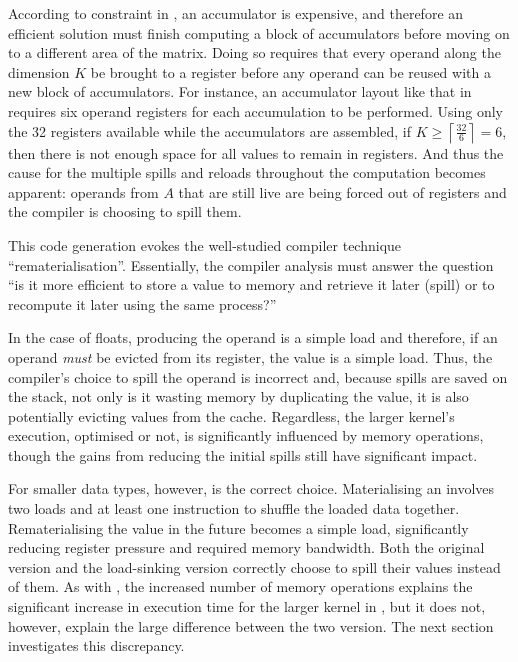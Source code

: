 \documentclass[\main/thesis.tex]{subfiles}
\begin{document}
According to constraint  in ,  an accumulator is expensive, and therefore an efficient solution must finish computing a block of accumulators before moving on to a different area of the matrix.
Doing so requires that every operand along the dimension $K$ be brought to a register before any operand can be reused with a new block of accumulators.
For instance, an accumulator layout like that in  requires six operand registers for each accumulation to be performed.
Using only the 32 registers available while the accumulators are assembled, if $K \geq \left\lceil \frac{32}{6} \right\rceil = 6$, then there is not enough space for all values to remain in registers.
And thus the cause for the multiple \glspl{spill} and reloads throughout the computation becomes apparent: operands from $A$ that are still \gls{live} are being forced out of registers and the compiler is choosing to \gls{spill} them.\footnotemark
{}

This code generation evokes the well-studied compiler technique ``\gls{rematerialisation}''.
Essentially, the compiler analysis must answer the question ``is it more efficient to store a value to memory and retrieve it later (\gls{spill}) or to recompute it later using the same process?''

In the case of floats, producing the operand is a simple load and therefore, if an operand \emph{must} be evicted from its register,  the value is a simple load.
Thus, the compiler's choice to \gls{spill} the operand is incorrect and, because \glspl{spill} are saved on the stack, not only is it wasting memory by duplicating the value, it is also potentially evicting values from the cache.
Regardless, the larger kernel's execution, optimised or not, is significantly influenced by memory operations, though the gains from reducing the initial \glspl{spill} still have significant impact.

For smaller data types, however,  is the correct choice.
Materialising an  involves two loads and at least one instruction to shuffle the loaded data together.
Rematerialising the value in the future becomes a simple load, significantly reducing register pressure and required memory bandwidth.
Both the original version and the load-sinking version correctly choose to \gls{spill} their values instead of  them.
As with , the increased number of memory operations explains the significant increase in execution time for the larger  kernel in , but it does not, however, explain the large difference between the two version.
The next section investigates this discrepancy.
\end{document}
